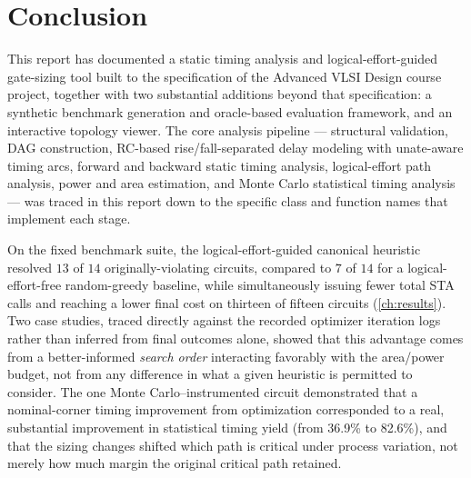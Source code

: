 \chapter{Conclusion}
\label{ch:conclusion}

This report has documented a static timing analysis and
logical-effort-guided gate-sizing tool built to the specification of the
Advanced VLSI Design course project, together with two substantial
additions beyond that specification: a synthetic benchmark generation and
oracle-based evaluation framework, and an interactive topology viewer. The
core analysis pipeline --- structural validation, DAG construction,
RC-based rise/fall-separated delay modeling with unate-aware timing arcs,
forward and backward static timing analysis, logical-effort path analysis,
power and area estimation, and Monte Carlo statistical timing analysis ---
was traced in this report down to the specific class and function names
that implement each stage.

On the fixed benchmark suite, the logical-effort-guided canonical
heuristic resolved $13$ of $14$ originally-violating circuits, compared to
$7$ of $14$ for a logical-effort-free random-greedy baseline, while
simultaneously issuing fewer total STA calls and reaching a lower final
cost on thirteen of fifteen circuits (\cref{ch:results}). Two case studies,
traced directly against the recorded optimizer iteration logs rather than
inferred from final outcomes alone, showed that this advantage comes from
a better-informed \emph{search order} interacting favorably with the
area/power budget, not from any difference in what a given heuristic is
permitted to consider. The one Monte Carlo--instrumented circuit
demonstrated that a nominal-corner timing improvement from optimization
corresponded to a real, substantial improvement in statistical timing
yield (from 36.9\% to 82.6\%), and that the sizing changes shifted which
path is critical under process variation, not merely how much margin the
original critical path retained.
